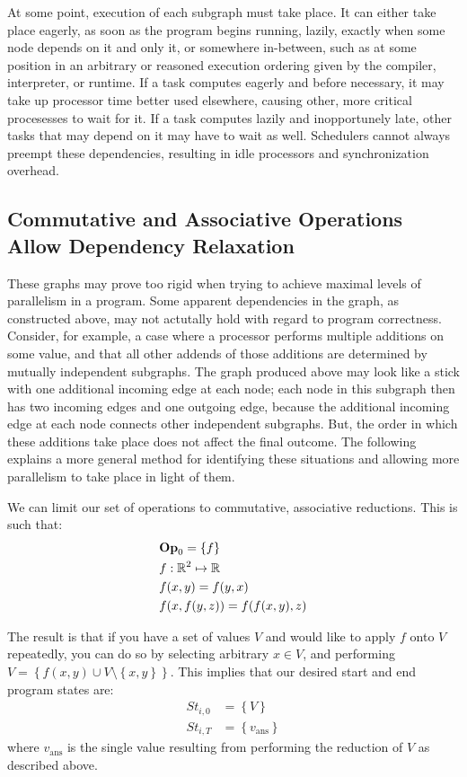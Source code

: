 At some point, execution of each subgraph must take place. It can either take
place eagerly, as soon as the program begins running, lazily, exactly when some
node depends on it and only it, or somewhere in-between, such as at some
position in an arbitrary or reasoned execution ordering given by the compiler,
interpreter, or runtime. If a task computes
eagerly and before necessary, it may take up processor time better used
elsewhere, causing other, more critical procesesses to wait for it. If a task
computes lazily and inopportunely late, other tasks that may depend on it may
have to wait as well. Schedulers cannot
always preempt these dependencies, resulting in idle processors and
synchronization overhead.

\subsection{Commutative and Associative Operations Allow Dependency Relaxation}
These graphs may prove too rigid when trying to achieve maximal levels of
parallelism in a program. Some apparent dependencies in the graph, as
constructed above, may not actutally hold with regard to program correctness.
Consider, for example, a case where a processor performs multiple additions on
some value, and that all other addends of those additions are determined by
mutually independent subgraphs. The graph produced above may look like a stick
with one additional incoming edge at each node; each node in this subgraph then
has two incoming edges and one outgoing edge, because the additional incoming
edge at each node connects other independent subgraphs. But, the order in which
these additions take place does not affect the final outcome. The following
explains a more general method for identifying these situations and allowing
more parallelism to take place in light of them.

We can limit our set of operations to commutative, associative reductions.
This is such that:
\begin{align}
    & \mathrm{\mathbf{Op}}_0 = \left\{f\right\}  \\
    & f: \mathbb{R}^2 \mapsto \mathbb{R}  \\
    & f(x,y) = f(y,x)  \\
    & f(x,f(y,z)) = f(f(x,y),z) 
\end{align}

The result is that if you have a set of values $V$ and would like to apply $f$
onto $V$ repeatedly, you can do so by selecting arbitrary $x \in V$, and
performing $V = \left\{ f(x,y) \cup V \setminus \left\{ x, y \right\}
\right\}$.  This implies that our desired start and end program states are:
\begin{align*}
    St_{i,0} &= \left\{ V \right\}  \\
    St_{i,T} &= \left\{ v_\text{ans} \right\}
\end{align*}
where $v_\text{ans}$ is the single value resulting from performing the reduction
of $V$ as described above.

